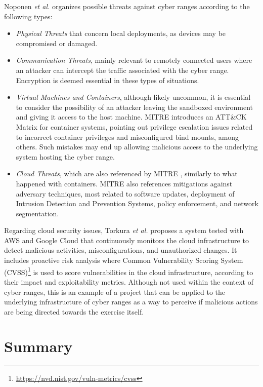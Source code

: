 Noponen \textit{et al.} \cite{cybersecurity_threat_and_mitigations_ref} organizes possible threats against cyber ranges according to the following types:

\begin{itemize}
    \item \textit{Physical Threats} that concern local deployments, as devices may be compromised or damaged.
    \item \textit{Communication Threats}, mainly relevant to remotely connected users where an attacker can intercept the traffic associated with the cyber range. Encryption is deemed essential in these types of situations.
    \item \textit{Virtual Machines and Containers}, although likely uncommon, it is essential to consider the possibility of an attacker leaving the sandboxed environment and giving it access to the host machine. MITRE \cite{mitre_containers_issues_ref} introduces an ATT\&CK Matrix for container systems, pointing out privilege escalation issues related to incorrect container privileges and misconfigured bind mounts, among others. Such mistakes may end up allowing malicious access to the underlying system hosting the cyber range.
    \item \textit{Cloud Threats}, which are also referenced by MITRE \cite{mitre_cloud_issues_ref}, similarly to what happened with containers. MITRE also references mitigations against adversary techniques, most related to software updates, deployment of Intrusion Detection and Prevention Systems, policy enforcement, and network segmentation.
\end{itemize}

Regarding cloud security issues, Torkura \textit{et al.} \cite{continuous_auditing_and_threat_detection_ref} proposes a system tested with AWS and Google Cloud that continuously monitors the cloud infrastructure to detect malicious activities, misconfigurations, and unauthorized changes. It includes proactive risk analysis where Common Vulnerability Scoring System (CVSS)\footnote{\url{https://nvd.nist.gov/vuln-metrics/cvss}} is used to score vulnerabilities in the cloud infrastructure, according to their impact and exploitability metrics. Although not used within the context of cyber ranges, this is an example of a project that can be applied to the underlying infrastructure of cyber ranges as a way to perceive if malicious actions are being directed towards the exercise itself.

\section{Summary} \label{sec:summary}

